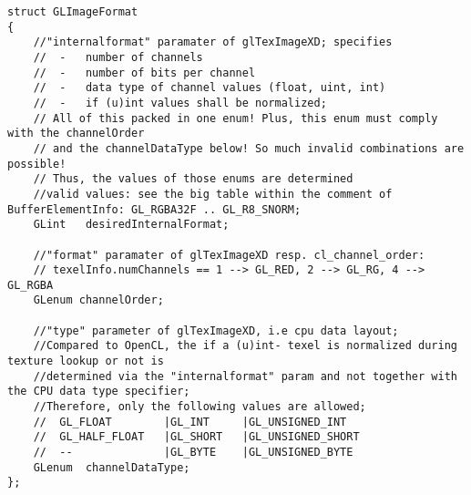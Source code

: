 \begin{lstlisting}[caption={GLImageFormat-Definition für intern symmetrischeren Umgang mit den 
		Type-/Layout-/Precision-/Normalization- Makros von OpenCL und OpenGL },label=listing:GLImageFormat]	
struct GLImageFormat
{
	//"internalformat" paramater of glTexImageXD; specifies
	//	-	number of channels
	//	-	number of bits per channel
	//	-	data type of channel values (float, uint, int)
	//	-	if (u)int values shall be normalized;
	// All of this packed in one enum! Plus, this enum must comply with the channelOrder
	// and the channelDataType below! So much invalid combinations are possible!
	// Thus, the values of those enums are determined
	//valid values: see the big table within the comment of BufferElementInfo: GL_RGBA32F .. GL_R8_SNORM;
	GLint  	desiredInternalFormat;

	//"format" paramater of glTexImageXD resp. cl_channel_order:
	// texelInfo.numChannels == 1 --> GL_RED, 2 -->	GL_RG, 4 --> GL_RGBA
	GLenum channelOrder;
	
	//"type" parameter of glTexImageXD, i.e cpu data layout;
	//Compared to OpenCL, the if a (u)int- texel is normalized during texture lookup or not is
	//determined via the "internalformat" param and not together with the CPU data type specifier;
	//Therefore, only the following values are allowed;
	//	GL_FLOAT		|GL_INT		|GL_UNSIGNED_INT
	//	GL_HALF_FLOAT	|GL_SHORT   |GL_UNSIGNED_SHORT
	//	--				|GL_BYTE	|GL_UNSIGNED_BYTE
	GLenum	channelDataType;
};			
		\end{lstlisting}


